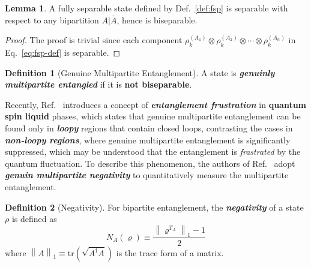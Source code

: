 \documentclass[12font]{article}
\numberwithin{equation}{section}    %
\theoremstyle{definition}
\newtheorem{definition}{Definition}[section]
\newtheorem{lemma}[theorem]{Lemma}
\newcommand{\lr}[1]{\left(  #1  \right)}
\newcommand{\mrm}[1]{\mathrm{#1}}
\newcommand{\tr}{\mrm{tr}}
\newcommand{\norm}[1]{\left\lVert#1\right\rVert}
\begin{document}
\begin{lemma}\label{lemma:special-sep}
    A fully separable state defined by Def.~\ref{def:fsp} is separable with respect to any bipartition $A|\overline{A}$, hence is biseparable.
\end{lemma}
\begin{proof}
    The proof is trivial since each component $\rho^{(A_1)}_{k} \otimes \rho^{(A_2)}_{k} \otimes \cdots \otimes \rho^{(A_n)}_{k}$ in Eq.~\eqref{eq:fsp-def} is separable. 
\end{proof}

\begin{definition}[Genuine Multipartite Entanglement]\label{def:GME}
    A state is \textbf{\textit{genuinly multipartite entangled}} if it is \textbf{not biseparable}. %
\end{definition}



Recently, Ref.~\cite{Lyu-Chandorkar-Kapoor-Takei-Sorensen-Witczak-Krempa_2026} introduces a concept of \textbf{\textit{entanglement frustration}} in \textbf{quantum spin liquid} phases, which states that genuine multipartite entanglement can be found only in \textbf{\textit{loopy}} regions that contain closed loops, contrasting the cases in \textbf{\textit{non-loopy regions}}, where genuine multipartite entanglement is significantly suppressed, which may be understood that the entanglement is \textit{frastrated} by the quantum fluctuation. To describe this phenomenon, the authors of Ref.~\cite{Lyu-Chandorkar-Kapoor-Takei-Sorensen-Witczak-Krempa_2026} adopt \textbf{\textit{genuin multipartite negativity}} to quantitatively measure the multipartite entanglement.

\begin{definition}[Negativity]\label{def:negativity}
    For bipartite entanglement, the \textbf{\textit{negativity}} of a state $\rho$ is defined as~\cite{Zyczkowski-Horodecki-Sanpera-Lewenstein_1998, Vidal-Werner_2002, Plenio_2005}
    \[
    N_A(\varrho) \equiv \frac{\norm{\varrho^{T_A}}_1 - 1}{2}
    \]
    where $\norm{A}_1 \equiv \tr \lr{\sqrt{A^\dagger A}}$ is the trace form of a matrix. 
\end{definition}
\end{document}

